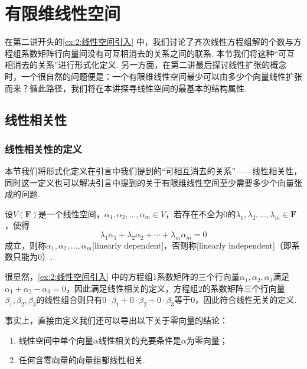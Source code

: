 \chapter{有限维线性空间}

在第二讲开头的\autoref{ex:2:线性空间引入} 中，我们讨论了齐次线性方程组解的个数与方程组系数矩阵行向量间没有可互相消去的关系之间的联系. 本节我们将这种``可互相消去的关系''进行形式化定义. 另一方面，在第二讲最后探讨线性扩张的概念时，一个很自然的问题便是：一个有限维线性空间最少可以由多少个向量线性扩张而来？循此路径，我们将在本讲探寻线性空间的最基本的结构属性.

\section{线性相关性}

\subsection{线性相关性的定义}

本节我们将形式化定义在引言中我们提到的``可相互消去的关系''——线性相关性，同时这一定义也可以解决引言中提到的关于有限维线性空间至少需要多少个向量张成的问题.
\begin{definition}
    设$V(\mathbf{F})$是一个线性空间，$\alpha_1,\alpha_2,\ldots,\alpha_m\in V$，若存在不全为0的$\lambda_1,\lambda_2,\ldots,\lambda_m\in\mathbf{F}$，使得
    \[\lambda_1\alpha_1+\lambda_2\alpha_2+\cdots+\lambda_m\alpha_m=0\]
    成立，则称$\alpha_1,\alpha_2,\ldots,\alpha_m$[linearly dependent]，否则称[linearly independent]（即系数只能为0）.
\end{definition}

很显然，\autoref{ex:2:线性空间引入} 中的方程组1系数矩阵的三个行向量$\alpha_1,\alpha_2,\alpha_3$满足$\alpha_1+\alpha_2-\alpha_3=0$，因此满足线性相关的定义，方程组2的系数矩阵三个行向量$\beta_1,\beta_2,\beta_3$的线性组合则只有$0\cdot\beta_1+0\cdot\beta_2+0\cdot\beta_3$等于0，因此符合线性无关的定义.

事实上，直接由定义我们还可以导出以下关于零向量的结论：
\begin{enumerate}
    \item 线性空间中单个向量$\alpha$线性相关的充要条件是$\alpha$为零向量；

    \item 任何含零向量的向量组都线性相关.
\end{enumerate}

